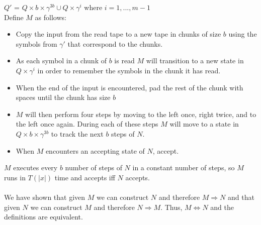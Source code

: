 \documentclass[letterpaper,notitlepage,twoside]{article}
\renewcommand{\implies}{\Rightarrow} %
\begin{document}
$Q'$ = $Q \times b \times \gamma^{3b} \cup Q \times \gamma^{i}$ where $i = 1, ..., m-1$ \\
Define $M$ as follows:
\begin{itemize}
\item Copy the input from the read tape to a new tape in chunks of size $b$ using the symbols from $\gamma'$ that correspond to the chunks. 
\item As each symbol in a chunk of $b$ is read $M$ will transition to a new state in $Q \times \gamma^{i}$ in order to remember the symbols in the chunk it has read. 
\item When the end of the input is encountered, pad the rest of the chunk with spaces until the chunk has size $b$ 
\item$M$ will then perform four steps by moving to the left once, right twice, and to the left once again. During each of these steps $M$ will move to a state in $Q \times b \times \gamma^{3b}$ to track the next $b$ steps of $N$. 
\item When $M$ encounters an accepting state of $N$, accept.
\end{itemize}
$M$ executes every $b$ number of steps of $N$ in a constant number of steps, so $M$ runs in $T(|x|)$ time and accepts iff $N$ accepts. \\ \\
We have shown that given $M$ we can construct $N$ and therefore $M \implies N$ and that given $N$ we can construct $M$ and therefore $N \implies M$. Thus, $M \Leftrightarrow N$ and the definitions are equivalent.
\end{document}
